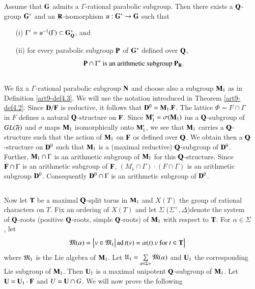 \begin{theorem}\label{art9-thm4.4}
Assume that $\mathbf{G}$ admits a $\Gamma$-rational parabolic subgroup. Then there exists a $\mathbf{Q}$-group $\mathbf{G}^\ast$ and an $\mathbf{R}$-isomorphism $u : \mathbf{G}^\ast \to \mathbf{G}$ such that 
\begin{itemize}
\item[(i)] $\Gamma' = u^{-1} (\Gamma) \subset \mathbf{G}^\ast_{\mathbf{Q}}$, and 

\item[(ii)] for every parabolic subgroup $\mathbf{P}$ of $\mathbf{G}^\ast$ defined over $\mathbf{Q}$,
$$
\mathbf{P} \cap \Gamma' \text{ is an arithmetic subgroup } \mathbf{P}_{\mathbf{R}}.
$$
\end{itemize}
\end{theorem}

\subsection{}\label{art9-subsec4.5}
We fix a $\Gamma$-rational parabolic subgroup $\mathbf{N}$ and choose also a subgroup $\mathbf{M}_1$ as in Definition \ref{art9-def4.3}. We  will use the notation introduced in Theorem \ref{art9-def4.2}. Since $\mathbf{D}/\mathbf{F}$ is reductive, it follows that $\mathbf{D}^0 =\mathbf{M}_1. \mathbf{F}$. The lattice $\Phi= F \cap \Gamma$ in $F$ defines a natural $\mathbf{Q}$-structure on $\mathbf{F}$. Since $\mathbf{M}'_1 = \sigma (\mathbf{M}_1)$ ius a $\mathbf{Q}$-subgroup of $GL (\mathfrak{F})$ and $\sigma$ maps $\mathbf{M}_1$ isomorphically onto $\mathbf{M}'_1$, we see that $\mathbf{M}_1$ carries a $\mathbf{Q}$-structure such that the action of $\mathbf{M}_1$ on $\mathbf{F}$ os defined over $\mathbf{Q}$. We obtain then a $\mathbf{Q}$-structure on $\mathbf{D}^0$ such that $\mathbf{M}_1$ is a (maximal reductive) $\mathbf{Q}$-subgroup of $\mathbf{D}^0$. Further, $\mathbf{M}_1 \cap \Gamma$ is an arithmetic subgroup of $\mathbf{M}_1$ for this $\mathbf{Q}$-structure. Since $\mathbf{F} \cap \Gamma$ is an arithmetic subgroup of $\mathbf{F}$, $(M_1 \cap \Gamma) \cdot (F \cap \Gamma)$ is an arithmetic subgroup $\mathbf{D}^0$. Consequently $\mathbf{D}^0 \cap \Gamma$ is an arithmetic subgroup of $\mathbf{D}^0$.

\subsection{}\label{art9-subsec4.6}
Now let $\mathbf{T}$ be a maximal $\mathbf{Q}$-split torus in $\mathbf{M}_1$ and $X(T)$ the group of rational characters on $T$. Fix an ordering of $X(T)$ and let $\Sigma$ (\resp $\Sigma^+, \Delta$)\pageoriginale denote the system of $\mathbf{Q}$-roots (\resp positive $\mathbf{Q}$-roots, simple $\mathbf{Q}$-roots) of $\mathbf{M}_1$ with respect to $\mathbf{T}$. For $\alpha \in \Sigma$, let
$$
\mathfrak{M}(\alpha) = \left\{v \in \mathfrak{M}_1 \big| \operatorname{ad} t(v) = \alpha (t). v \text{ for } t \in \mathbf{T} \right\}
$$
where $\mathfrak{M}_1$ is the Lie algebra of $\mathbf{M}_1$. Let $\mathfrak{U}_1 = \sum\limits_{\alpha \in\Sigma +} \mathfrak{M}(\alpha)$ and $\mathbf{U}_1$ the corresponding Lie subgroup of $\mathbf{M}_1$. Then $\mathbf{U}_1$ is a maximal unipotent $\mathbf{Q}$-subgroup of $\mathbf{M}_1$. Let $\mathbf{U} = \mathbf{U}_1 \cdot \mathbf{F}$ and $U = \mathbf{U} \cap G$. We will now prove the following 

